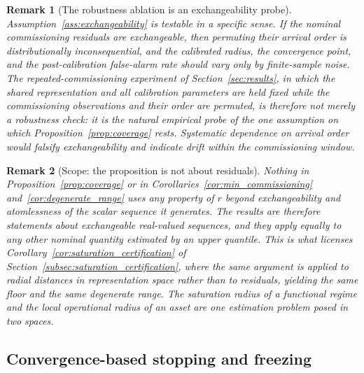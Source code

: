 \documentclass[a4paper]{cas-sc}
\newtheorem{remark}{Remark}
\newcommand{\residual}{\ensuremath{r}}
\begin{document}
\begin{remark}[The robustness ablation is an exchangeability probe]
\label{rem:exchangeability_test}
Assumption~\ref{ass:exchangeability} is testable in a specific sense. If
the nominal commissioning residuals are exchangeable, then permuting their
arrival order is distributionally inconsequential, and the calibrated
radius, the convergence point, and the post-calibration false-alarm rate
should vary only by finite-sample noise. The repeated-commissioning
experiment of Section~\ref{sec:results}, in which the shared
representation and all calibration parameters are held fixed while the
commissioning observations and their order are permuted, is therefore not
merely a robustness check: it is the natural empirical probe of the one
assumption on which Proposition~\ref{prop:coverage} rests. Systematic
dependence on arrival order would falsify exchangeability and indicate
drift within the commissioning window.
\end{remark}

\begin{remark}[Scope: the proposition is not about residuals]
\label{rem:saturation_link}
Nothing in Proposition~\ref{prop:coverage} or in
Corollaries~\ref{cor:min_commissioning} and~\ref{cor:degenerate_range} uses
any property of \(\residual\) beyond exchangeability and atomlessness of the
scalar sequence it generates. The results are therefore statements about
exchangeable real-valued sequences, and they apply equally to any other
nominal quantity estimated by an upper quantile. This is what licenses
Corollary~\ref{cor:saturation_certification} of
Section~\ref{subsec:saturation_certification}, where the same argument is
applied to radial distances in representation space rather than to residuals,
yielding the same floor and the same degenerate range. The saturation radius
of a functional regime and the local operational radius of an asset are one
estimation problem posed in two spaces.
\end{remark}

\subsection{Convergence-based stopping and freezing}
\label{subsec:stopping}
\end{document}
